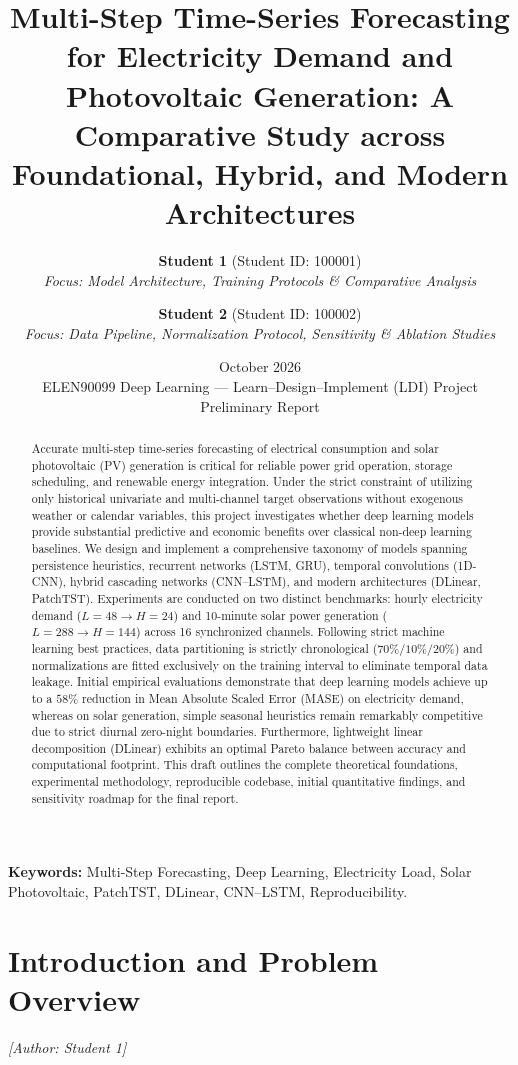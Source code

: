 \documentclass[11pt,a4paper]{article}
\title{\textbf{Multi-Step Time-Series Forecasting for Electricity Demand and Photovoltaic Generation: A Comparative Study across Foundational, Hybrid, and Modern Architectures}}
\author{
    \textbf{Student 1} (Student ID: 100001) \\
    \textit{Focus: Model Architecture, Training Protocols \& Comparative Analysis} \\
    \and
    \textbf{Student 2} (Student ID: 100002) \\
    \textit{Focus: Data Pipeline, Normalization Protocol, Sensitivity \& Ablation Studies}
}
\date{October 2026 \\ \vspace{0.5em} \small ELEN90099 Deep Learning --- Learn--Design--Implement (LDI) Project Preliminary Report}
\begin{document}
\maketitle

\begin{abstract}
Accurate multi-step time-series forecasting of electrical consumption and solar photovoltaic (PV) generation is critical for reliable power grid operation, storage scheduling, and renewable energy integration. Under the strict constraint of utilizing only historical univariate and multi-channel target observations without exogenous weather or calendar variables, this project investigates whether deep learning models provide substantial predictive and economic benefits over classical non-deep learning baselines. We design and implement a comprehensive taxonomy of models spanning persistence heuristics, recurrent networks (LSTM, GRU), temporal convolutions (1D-CNN), hybrid cascading networks (CNN--LSTM), and modern architectures (DLinear, PatchTST). Experiments are conducted on two distinct benchmarks: hourly electricity demand ($L=48 \to H=24$) and 10-minute solar power generation ($L=288 \to H=144$) across 16 synchronized channels. Following strict machine learning best practices, data partitioning is strictly chronological ($70\% / 10\% / 20\%$) and normalizations are fitted exclusively on the training interval to eliminate temporal data leakage. Initial empirical evaluations demonstrate that deep learning models achieve up to a $58\%$ reduction in Mean Absolute Scaled Error (MASE) on electricity demand, whereas on solar generation, simple seasonal heuristics remain remarkably competitive due to strict diurnal zero-night boundaries. Furthermore, lightweight linear decomposition (DLinear) exhibits an optimal Pareto balance between accuracy and computational footprint. This draft outlines the complete theoretical foundations, experimental methodology, reproducible codebase, initial quantitative findings, and sensitivity roadmap for the final report.
\end{abstract}

\vspace{1em}
\noindent\textbf{Keywords:} Multi-Step Forecasting, Deep Learning, Electricity Load, Solar Photovoltaic, PatchTST, DLinear, CNN--LSTM, Reproducibility.

\section{Introduction and Problem Overview}
\label{sec:intro}
\noindent\textit{[Author: Student 1]}
\end{document}
